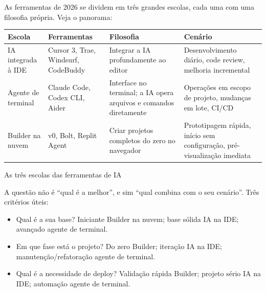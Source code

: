 


As ferramentas de 2026 se dividem em três grandes escolas, cada uma com uma filosofia própria. Veja o panorama:

\begin{center}
\begin{tabularx}{\linewidth}{|X|X|X|X|}
\hline
\textbf{Escola} & \textbf{Ferramentas} & \textbf{Filosofia} & \textbf{Cenário} \tabularnewline
\hline
IA integrada à IDE & Cursor 3, Trae, Windsurf, CodeBuddy & Integrar a IA profundamente ao editor & Desenvolvimento diário, code review, melhoria incremental \tabularnewline
Agente de terminal & Claude Code, Codex CLI, Aider & Interface no terminal; a IA opera arquivos e comandos diretamente & Operações em escopo de projeto, mudanças em lote, CI/CD \tabularnewline
Builder na nuvem & v0, Bolt, Replit Agent & Criar projetos completos do zero no navegador & Prototipagem rápida, início sem configuração, pré-visualização imediata \tabularnewline
\hline
\end{tabularx}
\end{center}

\begin{center}\small\color{gray}As três escolas das ferramentas de IA\end{center}

A questão não é “qual é a melhor”, e sim “qual combina com o seu cenário”. Três critérios úteis:

\begin{itemize}
  \item Qual é a sua base? Iniciante Builder na nuvem; base sólida IA na IDE; avançado agente de terminal.
  \item Em que fase está o projeto? Do zero Builder; iteração IA na IDE; manutenção/refatoração agente de terminal.
  \item Qual é a necessidade de deploy? Validação rápida Builder; projeto sério IA na IDE; automação agente de terminal.
\end{itemize}

